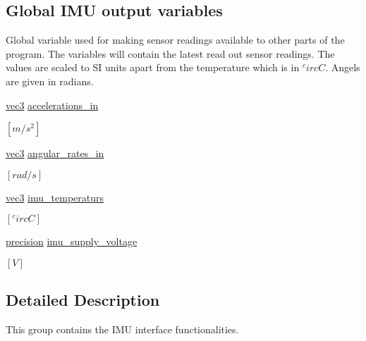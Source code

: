 \subsection*{\-Global \-I\-M\-U output variables}
\label{_amgrpf39e9e9a0e1f588f7f14ba40bfd8a838}%
 \-Global variable used for making sensor readings available to other parts of the program. \-The variables will contain the latest read out sensor readings. \-The values are scaled to \-S\-I units apart from the temperature which is in $^circ C$. \-Angels are given in radians. \begin{DoxyCompactItemize}
\item 
\hyperlink{nav__types_8h_a90c683614d896321009d3b3c401b764f}{vec3} \hyperlink{group__imu__interface_gaf92cab44915b7d9faaf5aeadb328bae6}{accelerations\-\_\-in}
\begin{DoxyCompactList}\small\item\em $[m/s^2]$ \end{DoxyCompactList}\item 
\hyperlink{nav__types_8h_a90c683614d896321009d3b3c401b764f}{vec3} \hyperlink{group__imu__interface_ga8cac4b2812dcb492989d7122c5eb0bfb}{angular\-\_\-rates\-\_\-in}
\begin{DoxyCompactList}\small\item\em $[rad/s]$ \end{DoxyCompactList}\item 
\hyperlink{nav__types_8h_a90c683614d896321009d3b3c401b764f}{vec3} \hyperlink{group__imu__interface_gacd438fa96131e9024d8ad206d83ffb66}{imu\-\_\-temperaturs}
\begin{DoxyCompactList}\small\item\em $[^circ C]$ \end{DoxyCompactList}\item 
\hyperlink{nav__types_8h_a37e1884b1f06826c49607cec459b4e8a}{precision} \hyperlink{group__imu__interface_ga3f561003deb253bcc716a6c690c87cfe}{imu\-\_\-supply\-\_\-voltage}
\begin{DoxyCompactList}\small\item\em $[V]$ \end{DoxyCompactList}\end{DoxyCompactItemize}


\subsection{\-Detailed \-Description}
\-This group contains the \-I\-M\-U interface functionalities. 

